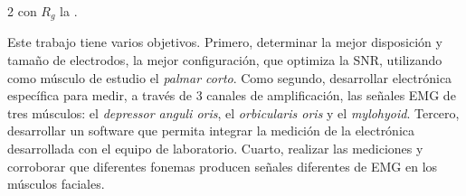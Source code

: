 \documentclass[11pt,letterpaper]{article}
\begin{document}
\begin{multicols*}{2}
\noindent con $R_g$ la .

Este trabajo tiene varios objetivos. Primero, determinar la mejor disposición y tamaño de electrodos, la mejor configuración, que optimiza la SNR, utilizando como músculo de estudio el \textit{palmar corto}. Como segundo, desarrollar electrónica específica para medir, a través de 3 canales de amplificación, las señales EMG de tres músculos: el \textit{depressor anguli oris}, el \textit{orbicularis oris} y el \textit{mylohyoid}. Tercero, desarrollar un software que permita integrar la medición de la electrónica desarrollada con el equipo de laboratorio. Cuarto, realizar las mediciones y corroborar que diferentes fonemas producen señales diferentes de EMG en los músculos faciales.




 


\end{multicols*}
\end{document}
